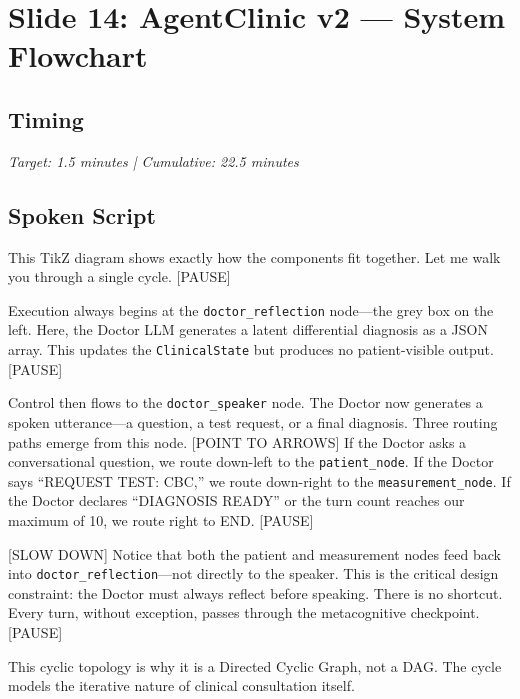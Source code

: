 \documentclass[12pt]{article}
\begin{document}
  \section{Slide 14: AgentClinic v2 --- System Flowchart}

  \subsection*{Timing}
  \textit{Target: 1.5 minutes | Cumulative: 22.5 minutes}

  \subsection*{Spoken Script}
  \begin{spokenbox}
   This TikZ diagram shows exactly how the components fit together. Let me walk you through a single cycle. [PAUSE]

  Execution always begins at the \texttt{doctor\_reflection} node---the grey box on the left. Here, the Doctor LLM generates a latent differential diagnosis as a JSON array. This updates the \texttt{ClinicalState} but produces no patient-visible output. [PAUSE]

  Control then flows to the \texttt{doctor\_speaker} node. The Doctor now generates a spoken utterance---a question, a test request, or a final diagnosis. Three routing paths emerge from this node. [POINT TO ARROWS] If the Doctor asks a conversational question, we route down-left to the \texttt{patient\_node}. If the Doctor says ``REQUEST TEST: CBC,'' we route down-right to the \texttt{measurement\_node}. If the Doctor declares ``DIAGNOSIS READY'' or the turn count reaches our maximum of 10, we route right to END. [PAUSE]

  [SLOW DOWN] Notice that both the patient and measurement nodes feed back into \texttt{doctor\_reflection}---not directly to the speaker. This is the critical design constraint: the Doctor must always reflect before speaking. There is no shortcut. Every turn, without exception, passes through the metacognitive checkpoint. [PAUSE]

  This cyclic topology is why it is a Directed Cyclic Graph, not a DAG. The cycle models the iterative nature of clinical consultation itself.
  \end{spokenbox}
\end{document}

